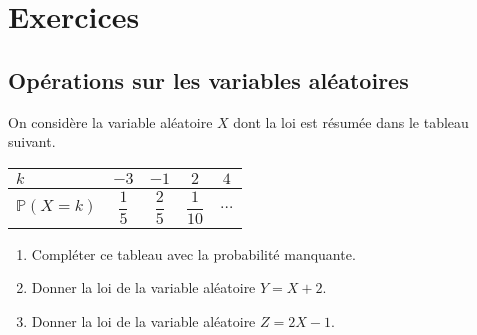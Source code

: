 \documentclass[11pt,fleqn, openany]{book} %
\begin{document}

\chapter{Exercices}


\section*{Opérations sur les variables aléatoires}

\begin{exercise}On considère la variable aléatoire $X$ dont la loi est résumée dans le tableau suivant.

\begin{minipage}{0.35\linewidth}
\renewcommand{\arraystretch}{2.2}
\begin{center}
\begin{tabular}{|l|c|c|c|c|}
\hline
$k$ & $-3$& $-1$ & $2$ & $4$ \\
\hline
$\mathbb{P}(X=k)$ & $\dfrac{1}{5}$ & $\dfrac{2}{5}$ & $\dfrac{1}{10}$   & $\dots$ \\
\hline \end{tabular}
\end{center}\end{minipage}\begin{minipage}{0.58\linewidth}

\begin{enumerate}
\item Compléter ce tableau avec la probabilité manquante.
\item Donner la loi de la variable aléatoire $Y=X+2$.
\item Donner la loi de la variable aléatoire $Z=2X-1$.
\end{enumerate}\end{minipage}\end{exercise}
\end{document}
